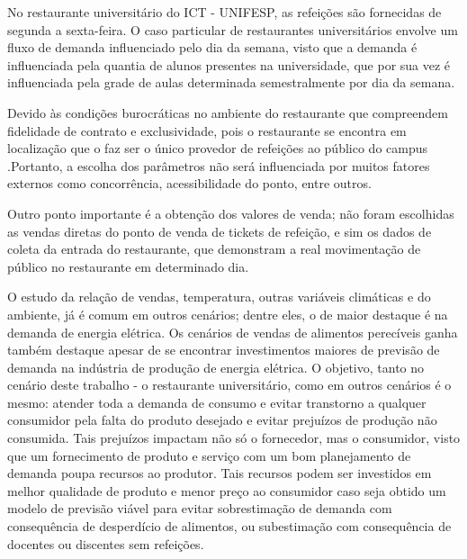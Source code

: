 \documentclass[	12pt, Times, openright, twoside, a4paper, english, brazil]{abntex2}
\begin{document}
        No restaurante universitário do ICT - UNIFESP, as refeições são fornecidas de segunda a sexta-feira. O caso particular de restaurantes universitários envolve um fluxo de demanda influenciado pelo dia da semana, visto que a demanda é influenciada pela quantia de alunos presentes na universidade, que por sua vez é influenciada pela grade de aulas determinada semestralmente por dia da semana. 
        
        Devido às condições burocráticas no ambiente do restaurante que compreendem fidelidade de contrato e exclusividade, pois o restaurante se encontra em localização que o faz ser o único provedor de refeições ao público do campus 
        .Portanto, a escolha dos parâmetros não será influenciada por muitos fatores externos como concorrência, acessibilidade do ponto, entre outros.

        Outro ponto importante é a obtenção dos valores de venda; não foram escolhidas as vendas diretas do ponto de venda de tickets de refeição, e sim os dados de coleta da entrada do restaurante, que demonstram a real movimentação de público no restaurante em determinado dia.

        O estudo da relação de vendas, temperatura, outras variáveis climáticas e do ambiente, já é comum em outros cenários; dentre eles, o de maior destaque é na demanda de energia elétrica. Os cenários de vendas de alimentos perecíveis ganha também destaque apesar de se encontrar investimentos maiores de previsão de demanda na indústria de produção de energia elétrica. O objetivo, tanto no cenário deste trabalho - o restaurante universitário, como em outros cenários é o mesmo: atender toda a demanda de consumo e evitar transtorno a qualquer consumidor pela falta do produto desejado e evitar prejuízos de produção não consumida. Tais prejuízos impactam não só o fornecedor, mas o consumidor, visto que um fornecimento de produto e serviço com um bom planejamento de demanda poupa recursos ao produtor. Tais recursos podem ser investidos em melhor qualidade de produto e menor preço ao consumidor caso seja obtido um modelo de previsão viável para evitar sobrestimação de demanda com consequência de desperdício de alimentos, ou subestimação com consequência de docentes ou discentes sem refeições. 
\end{document}
